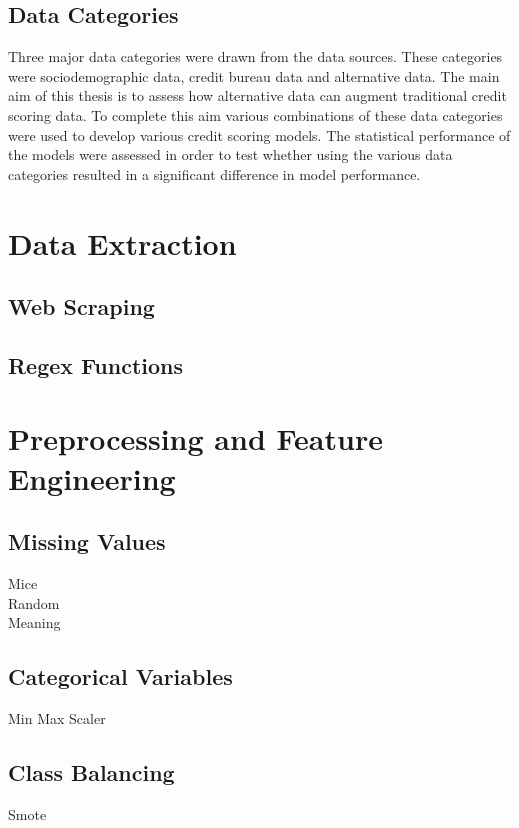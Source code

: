 \subsection{Data Categories}

Three major data categories were drawn from the data sources. These categories were sociodemographic data, credit bureau data and alternative data. The main aim of this thesis is to assess how alternative data can augment traditional credit scoring data. To complete this aim various combinations of these data categories were used to develop various credit scoring models. The statistical performance of the models were assessed in order to test whether using the various data categories resulted in a significant difference in model performance. 


\section{Data Extraction}

\subsection{Web Scraping}

\subsection{Regex Functions}


\section{Preprocessing and Feature Engineering}

\subsection{Missing Values}

Mice \\

Random \\

Meaning \\

\subsection{Categorical Variables}

Min Max Scaler

\subsection{Class Balancing}


Smote 